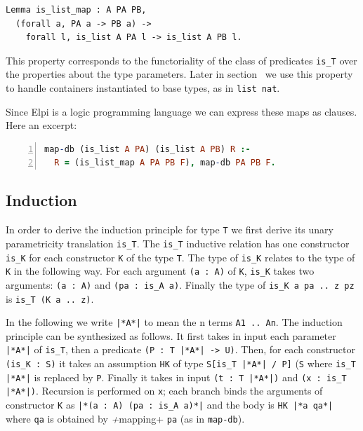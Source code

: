 \documentclass[sigplan,10pt,review]{acmart}\settopmatter{printfolios=true,printccs=false,printacmref=false}
\begin{document}
\begin{lstlisting}
Lemma is_list_map : A PA PB,
  (forall a, PA a -> PB a) ->
    forall l, is_list A PA l -> is_list A PB l.
\end{lstlisting}

\noindent
This property corresponds to the functoriality of the class of
predicates \lstinline+is_T+ over the properties about the type
parameters.  Later in section~\label{sec:derive:eqcorrect} we use this
property to handle containers instantiated to base types, as in
\lstinline+list nat+.

Since Elpi is a logic programming language we can express
these maps as clauses. Here an excerpt:

\begin{lstlisting}[language=Prolog, numbers=left]
map-db (is_list A PA) (is_list A PB) R :-
  R = (is_list_map A PA PB F), map-db PA PB F.
\end{lstlisting}



\subsection{Induction} %

In order to derive the induction principle for type
\lstinline+T+ we first derive its unary parametricity
translation \lstinline+is_T+. The \lstinline+is_T+ inductive
relation has one constructor \lstinline+is_K+ for each
constructor \lstinline+K+ of the type \lstinline+T+.
The type of \lstinline+is_K+ relates to the type of
\lstinline+K+ in the following way. For each
argument \lstinline+(a : A)+
of \lstinline+K+, \lstinline+is_K+ takes two arguments:
\lstinline+(a : A)+ and \lstinline+(pa : is_A a)+.
Finally the type of \lstinline+is_K a pa .. z pz+ is
\lstinline+is_T (K a .. z)+.

In the following we write \lstinline+|*A*|+ to mean the n terms
\lstinline+A1 .. An+.
The induction principle can be synthesized as follows. 
It first takes in input each parameter \lstinline+|*A*|+
of \lstinline+is_T+, then a predicate \lstinline+(P : T |*A*| -> U)+. Then,
for each constructor \lstinline+(is_K : S)+ it
takes an assumption \lstinline+HK+ of type \lstinline+S[is_T |*A*| / P]+
(\lstinline+S+ where \lstinline+is_T |*A*|+ is replaced by
\lstinline+P+. Finally it takes in input
\lstinline+(t : T |*A*|)+ and \lstinline+(x : is_T |*A*|)+.
Recursion is performed on \lstinline+x+; each branch binds
the arguments of constructor \lstinline+K+
as \lstinline+|*(a : A) (pa : is_A a)*|+ and
the body is \lstinline+HK |*a qa*|+ where \lstinline+qa+
is obtained by \emph+mapping+ \lstinline+pa+ (as in
\lstinline+map-db+).
\end{document}
